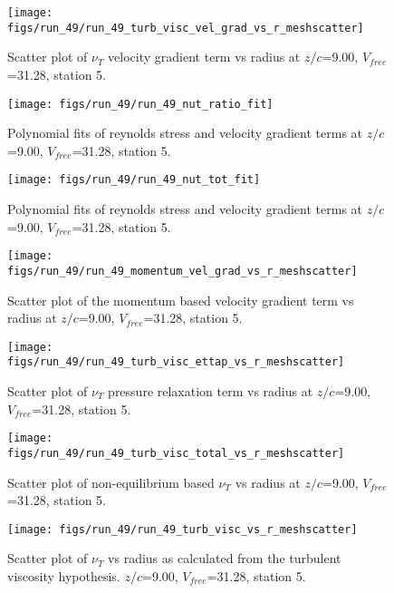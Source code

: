 \begin{figure}[H]
\centering
\texttt{[image: figs/run\_49/run\_49\_turb\_visc\_vel\_grad\_vs\_r\_meshscatter]}
\caption{Scatter plot of $\nu_T$ velocity gradient term vs radius at $z/c$=9.00, $V_{free}$=31.28, station 5.}
\end{figure}


\begin{figure}[H]
\centering
\texttt{[image: figs/run\_49/run\_49\_nut\_ratio\_fit]}
\caption{Polynomial fits of reynolds stress and velocity gradient terms at $z/c$=9.00, $V_{free}$=31.28, station 5.}
\end{figure}


\begin{figure}[H]
\centering
\texttt{[image: figs/run\_49/run\_49\_nut\_tot\_fit]}
\caption{Polynomial fits of reynolds stress and velocity gradient terms at $z/c$=9.00, $V_{free}$=31.28, station 5.}
\end{figure}


\begin{figure}[H]
\centering
\texttt{[image: figs/run\_49/run\_49\_momentum\_vel\_grad\_vs\_r\_meshscatter]}
\caption{Scatter plot of the momentum based velocity gradient term vs radius at $z/c$=9.00, $V_{free}$=31.28, station 5.}
\end{figure}


\begin{figure}[H]
\centering
\texttt{[image: figs/run\_49/run\_49\_turb\_visc\_ettap\_vs\_r\_meshscatter]}
\caption{Scatter plot of $\nu_T$ pressure relaxation term vs radius at $z/c$=9.00, $V_{free}$=31.28, station 5.}
\end{figure}


\begin{figure}[H]
\centering
\texttt{[image: figs/run\_49/run\_49\_turb\_visc\_total\_vs\_r\_meshscatter]}
\caption{Scatter plot of non-equilibrium based $\nu_T$ vs radius at $z/c$=9.00, $V_{free}$=31.28, station 5.}
\end{figure}


\begin{figure}[H]
\centering
\texttt{[image: figs/run\_49/run\_49\_turb\_visc\_vs\_r\_meshscatter]}
\caption{Scatter plot of $\nu_T$ vs radius as calculated from the turbulent viscosity hypothesis. $z/c$=9.00, $V_{free}$=31.28, station 5.}
\end{figure}


